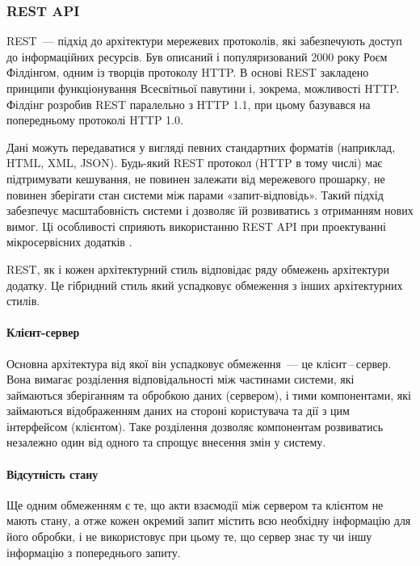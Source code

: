 \subsubsection{REST API}

REST~--- підхід до архітектури мережевих протоколів, які забезпечують доступ до інформаційних ресурсів. Був описаний і популяризований 2000 року Роєм Філдінгом, одним із творців протоколу HTTP. В основі REST закладено принципи функціонування Всесвітньої павутини і, зокрема, можливості HTTP. Філдінг розробив REST паралельно з HTTP 1.1, при цьому базувався на попередньому протоколі HTTP 1.0.

Дані можуть передаватися у вигляді певних стандартних форматів (наприклад, HTML, XML, JSON). Будь-який REST протокол (HTTP в тому числі) має підтримувати кешування, не повинен залежати від мережевого прошарку, не повинен зберігати стан системи між парами «запит-відповідь». Такий підхід забезпечує масштабовність системи і дозволяє їй розвиватись з отриманням нових вимог. Ці особливості сприяють використанню REST API при проектуванні мікросервісних додатків \cite{кучер2018мікросервісна}.

REST, як і кожен архітектурний стиль відповідає ряду обмежень архітектури додатку. Це гібридний стиль який успадковує обмеження з інших архітектурних стилів.

\paragraph{Клієнт-сервер}

Основна архітектура від якої він успадковує обмеження~--- це клієнт\,--\,сервер. Вона вимагає розділення відповідальності між частинами системи, які займаються зберіганням та обробкою даних (сервером), і тими компонентами, які займаються відображенням даних на стороні користувача та дії з цим інтерфейсом (клієнтом). Таке розділення дозволяє компонентам розвиватись незалежно один від одного та спрощує внесення змін у систему.

\paragraph{Відсутність стану}

Ще одним обмеженням є те, що акти взаємодії між сервером та клієнтом не мають стану, а отже кожен окремий запит містить всю необхідну інформацію для його обробки, і не використовує при цьому те, що сервер знає ту чи іншу інформацію з попереднього запиту.

